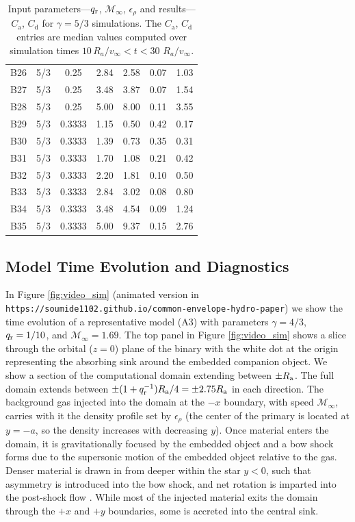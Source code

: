 \begin{table}[t]
{{\begin{tabular}{lcccccc}
B26 & 5/3 & 0.25 & 2.84 & 2.58 & 0.07 & 1.03 \\
B27 & 5/3 & 0.25 & 3.48 & 3.87 & 0.07 & 1.54 \\
B28 & 5/3 & 0.25 & 5.00 & 8.00 & 0.11 & 3.55 \\
B29 & 5/3 & 0.3333 & 1.15 & 0.50 & 0.42 & 0.17 \\
B30 & 5/3 & 0.3333 & 1.39 & 0.73 & 0.35 & 0.31 \\
B31 & 5/3 & 0.3333 & 1.70 & 1.08 & 0.21 & 0.42 \\
B32 & 5/3 & 0.3333 & 2.20 & 1.81 & 0.10 & 0.50 \\
B33 & 5/3 & 0.3333 & 2.84 & 3.02 & 0.08 & 0.80 \\
B34 & 5/3 & 0.3333 & 3.48 & 4.54 & 0.09 & 1.24 \\
B35 & 5/3 & 0.3333 & 5.00 & 9.37 & 0.15 & 2.76 \\
\hline
\end{tabular}
}}
\caption{Input parameters---$q_{\rm r}$, $\mathcal M_\infty$, $\epsilon_\rho$ and results---$C_{\mathrm a}$, $C_{\mathrm d}$ for $\gamma = 5/3$ simulations. The $C_\mathrm{a}$, $C_\mathrm{d}$ entries are median values computed over simulation times $10 \, R_a / v_\infty < t < 30$ $R_a / v_\infty$.}
\label{tab:sims_53_params}
\end{table}

\subsection{Model Time Evolution and Diagnostics}

In Figure \ref{fig:video_sim} (animated version in \newline  \verb"https://soumide1102.github.io/common-envelope-hydro-paper") we show the time evolution of a representative model (A3) with parameters $\gamma = 4/3$, $q_{\rm r} = 1/10$, and  $\mathcal{M}_\infty = 1.69$. The top panel in Figure \ref{fig:video_sim} shows a slice through the orbital ($z = 0$) plane of the binary with the white dot at the origin representing the absorbing sink around the embedded companion object. We show a section of the computational domain extending between $\pm R_{\rm a}$. The full domain extends between $\pm (1 + q_{\rm r}^{-1}) R_{\mathrm{a}}/4 = \pm 2.75 R_{\rm a}$ in each direction. The background gas injected into the domain at the $-x$ boundary, with speed $\mathcal{M}_\infty$, carries with it the density profile set by $\epsilon_\rho$ (the center of the primary is located at $y = - a$, so the density increases with decreasing $y$). Once material enters the domain, it is gravitationally focused by the embedded object and a bow shock forms due to the supersonic motion of the embedded object relative to the gas. Denser material is drawn in from deeper within the star $y<0$, such that asymmetry is introduced into the bow shock, and net rotation is imparted into the post-shock flow \cite{MacLeod_2015,MacLeod:2017}. While most of the injected material exits the domain through the $+x$ and $+y$ boundaries, some is accreted into the central sink. 


